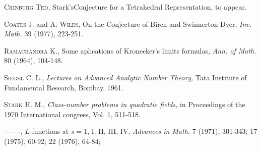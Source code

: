\begin{thebibliography}{99}
 \textsc{Chinburg Ted}, Stark's\pageoriginale Conjecture for a Tetrahedral Representation, to appear.

 \textsc{Coates J.} and \textsc{A. Wiles,} On the Conjecture of Birch and Swinnerton-Dyer, \textit{Inv. Math.} 39 (1977), 223-251.

 \textsc{Ramachandra K.,} Some aplications of Kronecker's limits formulas, \textit{Ann. of Math.} 80 (1964), 104-148.

 \textsc{Siegel C. L.,} \textit{Lectures on Advanced Analytic Number Theory,} Tata Institute of Fundamental Research, Bombay, 1961.

 \textsc{Stark H. M.,} \textit{Class-number problems in quadratic fields,} in Proceedings of the 1970 International congress, Vol. 1, 511-518.

 -------, $L$-functions at $s =1$, I. II, III, IV, \textit{Advances in Math.} 7 (1971), 301-343; 17  (1975), 60-92; 22 (1976), 64-84;
\end{thebibliography}
